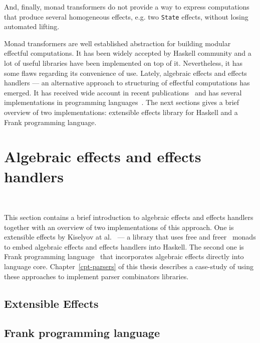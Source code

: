   And, finally, monad transformers do not provide a way to express computations that produce several homogeneous effects, e.g. two \texttt{State} effects, without losing automated lifting.

  Monad transformers are well established abstraction for building modular effectful
  computations. It has been widely accepted by Haskell community and a lot of
  useful libraries have been implemented on top of it. Nevertheless, it has some
  flaws regarding its convenience of use. Lately, algebraic effects and effects
  handlers --- an alternative approach to structuring of effectful computations
  has emerged. It has received wide account in recent publications~\cite{}
  and has several implementations in programming languages~\cite{}. The next
  sections gives a brief overview of two implementations: extensible effects library
  for Haskell and a Frank programming language.

  \section{Algebraic effects and effects handlers}
  ~\label{cpt-effects:alg-effects}

  This section contains a brief introduction to algebraic effects and effects
  handlers together with an overview of two implementations of this approach.
  One is extensible
  effects by Kiselyov at al.~\cite{Kiselyov:2013:EEA:2578854.2503791} --- a library
  that uses free and freer~\cite{Kiselyov:2015:FMM:2887747.2804319} monads to embed
  algebraic effects and effects handlers into Haskell.
  The second one is Frank programming
  language~\cite{DBLP:conf/popl/LindleyMM17} that incorporates algebraic effects
  directly into language core. Chapter~\ref{cpt-parsers} of this thesis describes
  a case-study of using these approaches to implement parser combinators libraries.


    \subsection{Extensible Effects}

    \subsection{Frank programming language}